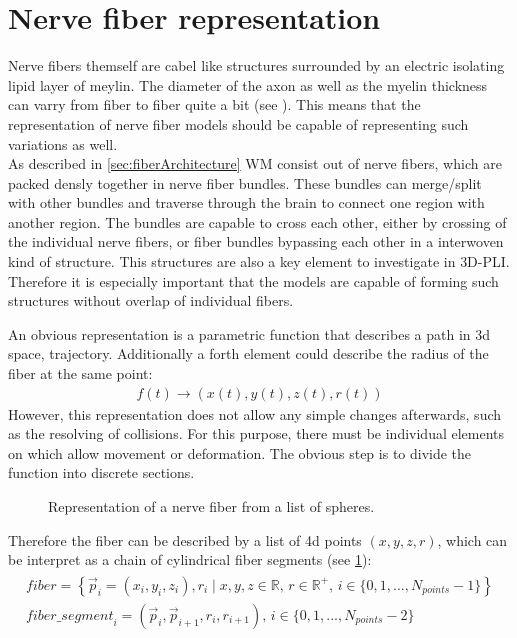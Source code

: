 \section{Nerve fiber representation}
\label{sec:nerve_fiber_representation}
% 
Nerve fibers themself are cabel like structures surrounded by an electric isolating lipid layer of meylin.
The diameter of the axon as well as the myelin thickness can varry from fiber to fiber quite a bit (see \dummy{}).
This means that the representation of nerve fiber models should be capable of representing such variations as well.\\
% 
As described in \cref{sec:fiberArchitecture} \ac{WM} consist out of nerve fibers, which are packed densly together in nerve fiber bundles.
These bundles can merge/split with other bundles and traverse through the brain to connect one region with another region.
The bundles are capable to cross each other, either by crossing of the individual nerve fibers, or fiber bundles bypassing each other in a interwoven kind of structure.
This structures are also a key element to investigate in \ac{3D-PLI}.
Therefore it is especially important that the models are capable of forming such structures without overlap of individual fibers.
\par
% 
An obvious representation is a parametric function that describes a path in 3d space, \ie{} trajectory.
Additionally a forth element could describe the radius of the fiber at the same point:
\begin{align}
f(t) \rightarrow (x(t),y(t), z(t), r(t))
\end{align}
However, this representation does not allow any simple changes afterwards, such as the resolving of collisions.
For this purpose, there must be individual elements on which allow movement or deformation.
The obvious step is to divide the function into discrete sections.
% 
\begin{figure}[!t]
    \setlength{\tikzwidth}{0.85\textwidth}
    \centering
	\caption[]{Representation of a nerve fiber from a list of spheres.}
	\label{fig:fiberReb}
\end{figure}
% 
Therefore the fiber can be described by a list of 4d points $(x,y,z,r)$, which can be interpret as a chain of cylindrical fiber segments (see \cref{fig:fiberReb}):
\begin{align}
\begin{split}
\mathit{fiber} = \left\{ \vec{p}_i=(x_i,y_i,z_i), r_i \mid x,y,z \in \mathbb{R}, \, r \in \mathbb{R^+}, \, i \in \{0,1,...,N_{\mathit{points}}-1\}\right\} \\
\mathit{fiber\_segment}_i = (\vec{p}_i, \vec{p}_{i+1}, r_i, r_{i+1}), \, i \in \{0,1,...,N_{\mathit{points}}-2\}
\end{split}
\end{align}
